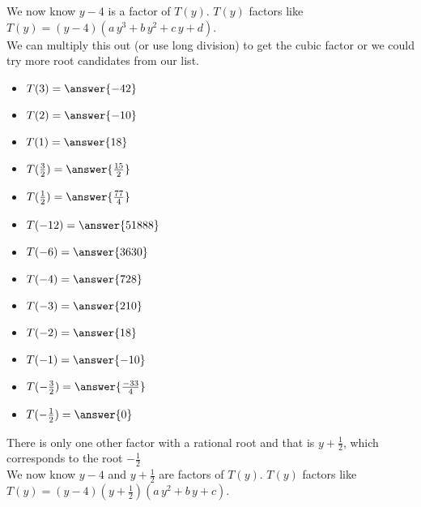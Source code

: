 \documentclass{ximera}
\begin{document}
\begin{example}
We now know $y-4$ is a factor of $T(y)$.  $T(y)$ factors like $T(y) = (y-4) (a \, y^3 + b \, y^2 + c \, y + d)$. \\

We can  multiply this out (or use long division) to get the cubic factor or we could try more root candidates from our list.


\begin{itemize}
\item $T(3) =  \answer{-42}$  \\
\item $T(2) =  \answer{-10}$  \\
\item $T(1) =  \answer{18}$  \\
\item $T(\tfrac{3}{2}) =  \answer{\tfrac{15}{2}}$  \\
\item $T(\tfrac{1}{2}) =  \answer{\tfrac{77}{4}}$  \\
\item $T(-12) =  \answer{51888}$  \\
\item $T(-6) =  \answer{3630}$  \\
\item $T(-4) =  \answer{728}$  \\
\item $T(-3) =  \answer{210}$  \\
\item $T(-2) =  \answer{18}$  \\
\item $T(-1) =  \answer{-10}$  \\
\item $T(-\tfrac{3}{2}) =  \answer{\tfrac{-33}{4}}$  \\
\item $T(-\tfrac{1}{2}) =  \answer{0}$  
\end{itemize}

There is only one other factor with a rational root and that is $y+\frac{1}{2}$, which corresponds to the root $-\frac{1}{2}$ \\



We now know $y-4$ and $y+\frac{1}{2}$ are factors of $T(y)$.  $T(y)$ factors like $T(y) = (y-4) \left(y+\frac{1}{2}\right) (a \, y^2 + b \, y + c)$. \\






















\end{example}
\end{document}
